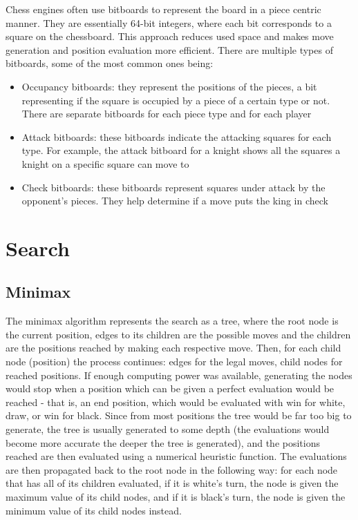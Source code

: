 Chess engines often use bitboards to represent the board in a piece centric manner. They are essentially 64-bit integers, where each bit corresponds to a square on the chessboard. This approach reduces used space and makes move generation and position evaluation more efficient. There are multiple types of bitboards, some of the most common ones being:
\begin{itemize}
    \item Occupancy bitboards: they represent the positions of the pieces, a bit representing if the square is occupied by a piece of a certain type or not. There are separate bitboards for each piece type and for each player
    \item Attack bitboards: these bitboards indicate the attacking squares for each type. For example, the attack bitboard for a knight shows all the squares a knight on a specific square can move to
    \item Check bitboards: these bitboards represent squares under attack by the opponent's pieces. They help determine if a move puts the king in check
\end{itemize}

\section{Search}
\label{sec:ch2sec2}

\subsection{Minimax}
\label{subsec:ch2sec2subsec1}

The minimax algorithm represents the search as a tree, where the root node is the current position, edges to its children are the possible moves and the children are the positions reached by making each respective move. Then, for each child node (position) the process continues: edges for the legal moves, child nodes for reached positions. If enough computing power was available, generating the nodes would stop when a position which can be given a perfect evaluation would be reached - that is, an end position, which would be evaluated with win for white, draw, or win for black. Since from most positions the tree would be far too big to generate, the tree is usually generated to some depth (the evaluations would become more accurate the deeper the tree is generated), and the positions reached are then evaluated using a numerical heuristic function. The evaluations are then propagated back to the root node in the following way: for each node that has all of its children evaluated, if it is white's turn, the node is given the maximum value of its child nodes, and if it is black's turn, the node is given the minimum value of its child nodes instead.\cite{klein2022neural}

